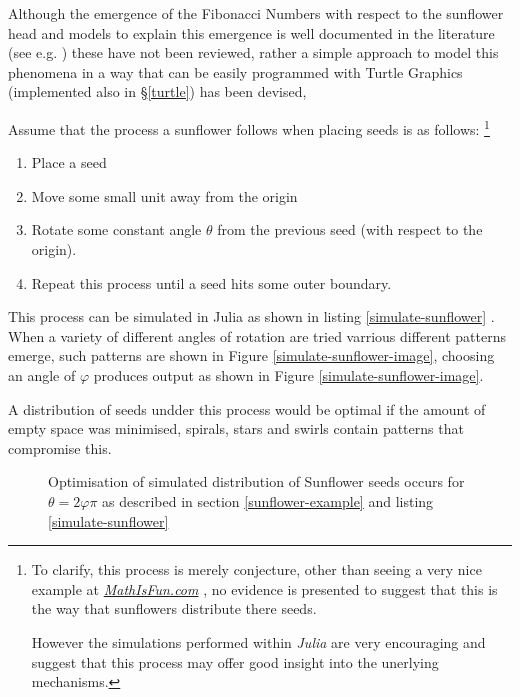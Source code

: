 \documentclass[a4paper,11pt,twoside]{article}
\begin{document}
Although the emergence of the Fibonacci Numbers with respect to the sunflower head and models to explain this emergence is well documented in the literature (see e.g. \cite{ridleyPackingEfficiencySunflower1982,mathaiConstructingSunflowerHead1974,vogelBetterWayConstruct1979}) these have not been reviewed, rather a simple approach to model this phenomena in a way that can be easily programmed with Turtle Graphics (implemented also in \S \ref{turtle}) has been devised,

Assume that the process a sunflower follows when placing seeds is as follows: \footnote{To clarify, this process is merely conjecture, other than seeing a very nice example at \href{https://www.mathsisfun.com/numbers/nature-golden-ratio-fibonacci.html}{\emph{MathIsFun.com}}
\cite{NatureGoldenRatio2018}, no evidence is presented to suggest that this is the way
that sunflowers distribute there seeds.

However the simulations performed within \emph{Julia} are very encouraging and
suggest that this process may offer good insight into the unerlying mechanisms.}

\begin{enumerate}
\item Place a seed
\item Move some small unit away from the origin
\item Rotate some constant angle \(\mathtt{\theta}\)  from the previous seed (with respect to the origin).
\item Repeat this process until a seed hits some outer boundary.
\end{enumerate}

This process can be simulated in Julia as shown in listing
\ref{simulate-sunflower} . When a variety of different angles of rotation are
tried varrious different patterns emerge, such patterns are shown in Figure \ref{simulate-sunflower-image}, choosing an angle of \(\varphi\) produces output as shown in Figure \ref{simulate-sunflower-image}.

A distribution of seeds undder this process would be optimal if the amount of empty space was minimised, spirals, stars and swirls contain patterns that compromise this.



\begin{figure}
\centering

\caption{\label{simulate-sunflower-phi}Optimisation of simulated distribution of Sunflower seeds occurs for \(\theta =2 \varphi  \pi\) as described in section \ref{sunflower-example} and listing \ref{simulate-sunflower}}
\end{figure}
\end{document}
